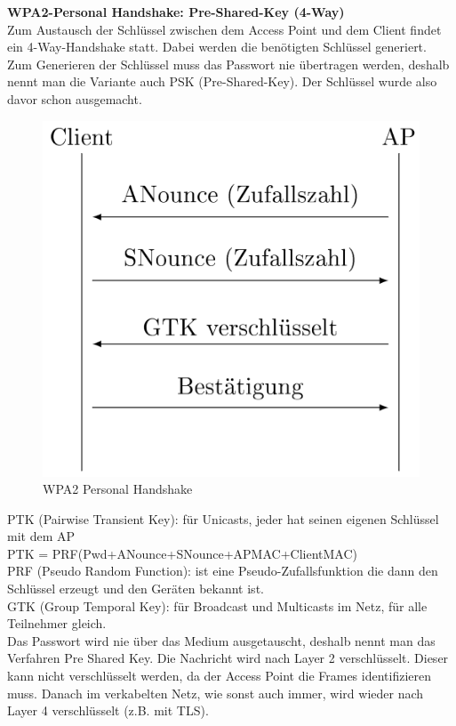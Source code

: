 \textbf{WPA2-Personal Handshake: Pre-Shared-Key (4-Way)} \\
Zum Austausch der Schlüssel zwischen dem Access Point und dem Client findet ein 4-Way-Handshake statt. Dabei werden die benötigten Schlüssel generiert. Zum Generieren der Schlüssel muss das Passwort nie übertragen werden, deshalb nennt man die Variante auch PSK (Pre-Shared-Key). Der Schlüssel wurde also davor schon ausgemacht.

\begin{figure}[H]
	\centering
	\includegraphics[width=1.0\linewidth]{figures/wpa2_personal_handshake.png}
	\caption{WPA2 Personal Handshake}
\end{figure}
PTK (Pairwise Transient Key): für Unicasts, jeder hat seinen eigenen Schlüssel mit dem AP \\
PTK = PRF(Pwd+ANounce+SNounce+APMAC+ClientMAC) \\
PRF (Pseudo Random Function): ist eine Pseudo-Zufallsfunktion die dann den Schlüssel erzeugt und den Geräten bekannt ist. \\
GTK (Group Temporal Key): für Broadcast und Multicasts im Netz, für alle Teilnehmer gleich. \\

Das Passwort wird nie über das Medium ausgetauscht, deshalb nennt man das Verfahren Pre Shared Key. Die Nachricht wird nach Layer 2 verschlüsselt. Dieser kann nicht verschlüsselt werden, da der Access Point die Frames identifizieren muss. Danach im verkabelten Netz, wie sonst auch immer, wird wieder nach Layer 4 verschlüsselt (z.B. mit TLS).